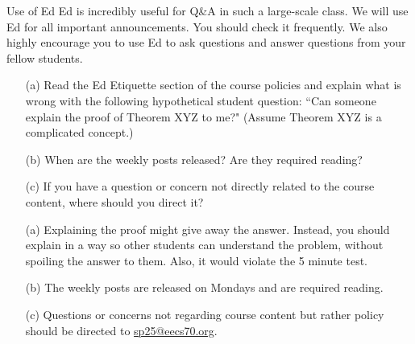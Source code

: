 \begin{homeworkProblem}{Use of Ed}
    Ed is incredibly useful for Q\&A in such a large-scale class. We will 
    use Ed for all important announcements. You should check it frequently. 
    We also highly encourage you to use Ed to ask questions and answer 
    questions from your fellow students.

    \begin{itemize}
        \item[(a)] Read the Ed Etiquette section of the course policies and 
        explain what is wrong with the following hypothetical student 
        question: ``Can someone explain the proof of Theorem XYZ to me?" 
        (Assume Theorem XYZ is a complicated concept.)
        \item[(b)] When are the weekly posts released? Are they required 
        reading?
        \item[(c)] If you have a question or concern not directly related 
        to the course content, where should you direct it? 
    \end{itemize}

    \solution

    \begin{itemize}
        \item[(a)] Explaining the proof might give away the answer. 
        Instead, you should explain in a way so other students can 
        understand the problem, without spoiling the answer to them. Also, 
        it would violate the 5 minute test. 
        \item[(b)] The weekly posts are released on Mondays and are 
        required reading.
        \item[(c)] Questions or concerns not regarding course content but 
        rather policy should be directed to \href{mailto:sp25@eecs70.org}
        {sp25@eecs70.org}.
    \end{itemize}
    
\end{homeworkProblem}